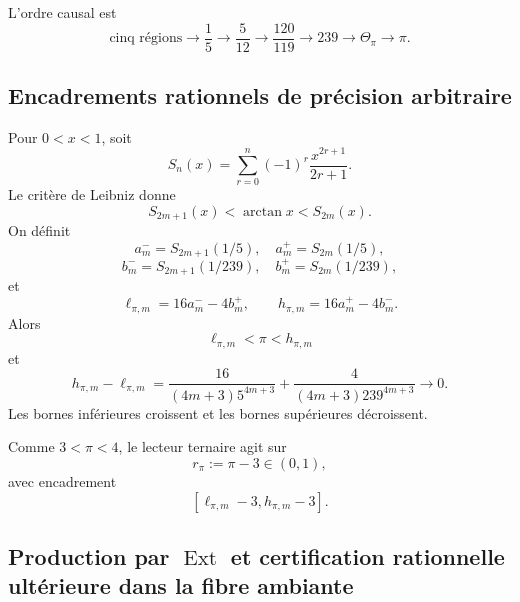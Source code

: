 L'ordre causal est
\[
 \text{cinq régions}
 \to\frac15
 \to\frac5{12}
 \to\frac{120}{119}
 \to239
 \to\Theta_\pi
 \to\pi.
\]

\subsection{Encadrements rationnels de précision arbitraire}

Pour \(0<x<1\), soit
\[
 S_n(x)=\sum_{r=0}^{n}(-1)^r\frac{x^{2r+1}}{2r+1}.
\]
Le critère de Leibniz donne
\[
 S_{2m+1}(x)<\arctan x<S_{2m}(x).
\]
On définit
\[
 a_m^-=S_{2m+1}(1/5),\quad a_m^+=S_{2m}(1/5),
\]
\[
 b_m^-=S_{2m+1}(1/239),\quad b_m^+=S_{2m}(1/239),
\]
et
\begin{equation}
 \ell_{\pi,m}=16a_m^- -4b_m^+,
 \qquad
 h_{\pi,m}=16a_m^+ -4b_m^-.
 \label{p12-83-c8-s1:eq:horquilla-pi-autonoma}
\end{equation}
Alors
\[
 \ell_{\pi,m}<\pi<h_{\pi,m}
\]
et
\begin{equation}
 h_{\pi,m}-\ell_{\pi,m}
 =
 \frac{16}{(4m+3)5^{4m+3}}
 +\frac{4}{(4m+3)239^{4m+3}}
 \longrightarrow0.
 \label{p12-83-c8-s1:eq:anchura-horquilla-pi}
\end{equation}
Les bornes inférieures croissent et les bornes supérieures décroissent.

Comme \(3<\pi<4\), le lecteur ternaire agit sur
\[
 r_\pi:=\pi-3\in(0,1),
\]
avec encadrement
\[
 [\ell_{\pi,m}-3,h_{\pi,m}-3].
\]

\subsection{Production par \texorpdfstring{$\operatorname{Ext}$}{Ext} et certification rationnelle ultérieure dans la fibre ambiante}

